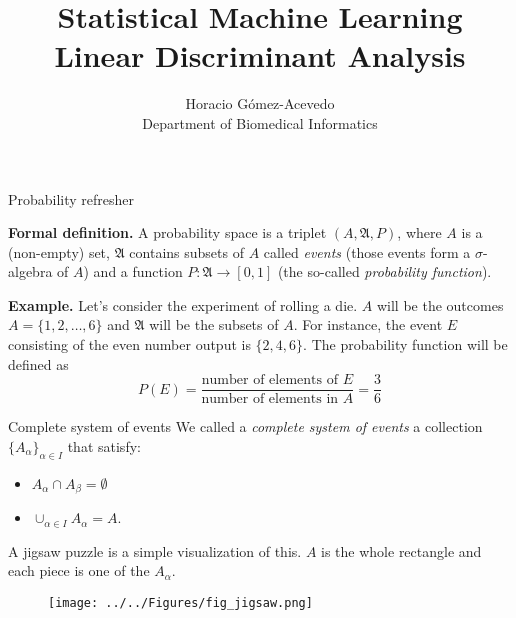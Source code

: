 \documentclass{beamer}
\title{Statistical Machine Learning\\ Linear Discriminant Analysis}
\author{Horacio G\'omez-Acevedo\\ Department of Biomedical Informatics}
\begin{document}
	\begin{frame}[plain]
		\maketitle
	\end{frame}
\begin{frame}{Probability refresher}
	
	{\bf Formal definition. } A probability space is a triplet $(A, \mathfrak{A},P )$, where $A$ is a (non-empty) set, $\mathfrak{A}$ contains subsets of $A$ called {\it events} (those events form a $\sigma$-algebra of $A$) and a function $P\colon \mathfrak{A}\to [0,1]$ (the so-called {\it probability function}).
	
	{\bf Example.}
	Let's consider the experiment of rolling a die. $A$ will be the outcomes $A=\{ 1,2, \ldots, 6\}$ and $\mathfrak{A}$ will be the subsets of $A$. For instance, the event $E$ consisting of the even number output is $\{2,4,6\}$. The probability function will be defined as 
	\begin{equation*}
		P(E) = \frac{ \textrm{number of elements of }E}{\textrm{number of elements in }A}= \frac{3}{6}
	\end{equation*}
	
\end{frame}

\begin{frame}{Complete system of events}
	We called a {\it complete system of events} a collection  $\{ A_\alpha \}_{\alpha \in I}$ that satisfy:
	\begin{itemize}
		\item $A_\alpha \cap A_\beta = \emptyset$
		\item $\cup_{\alpha \in I} A_\alpha= A$.
	\end{itemize}
 A jigsaw puzzle is a simple visualization of this. $A$ is the whole rectangle and each piece is one of the $A_\alpha$. 
 \begin{figure}[h]
 	\centering
 	\texttt{[image: ../../Figures/fig\_jigsaw.png]}
 \end{figure}
\end{frame}
\end{document}
